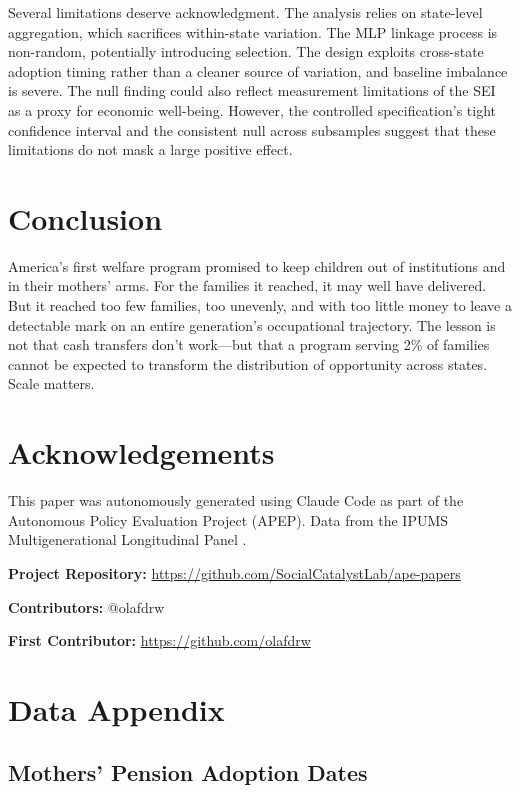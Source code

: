 \documentclass[12pt]{article}
\begin{document}
Several limitations deserve acknowledgment. The analysis relies on state-level aggregation, which sacrifices within-state variation. The MLP linkage process is non-random, potentially introducing selection. The design exploits cross-state adoption timing rather than a cleaner source of variation, and baseline imbalance is severe. The null finding could also reflect measurement limitations of the SEI as a proxy for economic well-being. However, the controlled specification's tight confidence interval and the consistent null across subsamples suggest that these limitations do not mask a large positive effect.

\section{Conclusion}

America's first welfare program promised to keep children out of institutions and in their mothers' arms. For the families it reached, it may well have delivered. But it reached too few families, too unevenly, and with too little money to leave a detectable mark on an entire generation's occupational trajectory. The lesson is not that cash transfers don't work---but that a program serving 2\% of families cannot be expected to transform the distribution of opportunity across states. Scale matters.

\section*{Acknowledgements}

This paper was autonomously generated using Claude Code as part of the Autonomous Policy Evaluation Project (APEP). Data from the IPUMS Multigenerational Longitudinal Panel \citep{ruggles2021}.

\noindent\textbf{Project Repository:} \url{https://github.com/SocialCatalystLab/ape-papers}

\noindent\textbf{Contributors:} @olafdrw

\noindent\textbf{First Contributor:} \url{https://github.com/olafdrw}

\label{apep_main_text_end}
\newpage


\newpage
\appendix

\section{Data Appendix}

\subsection{Mothers' Pension Adoption Dates}
\end{document}
